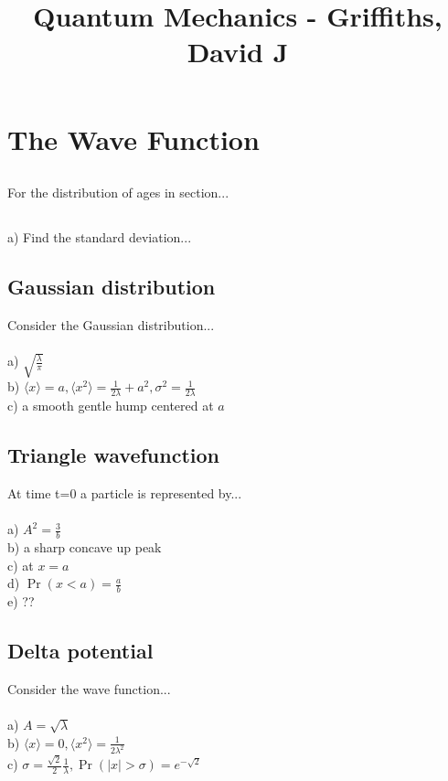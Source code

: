 \documentclass{article}
\title{Quantum Mechanics - Griffiths, David J}
\date{}
\newcommand{\<}{\langle}
\renewcommand{\>}{\rangle}
\begin{document}
\maketitle

\section{The Wave Function}

\subsection{}
For the distribution of ages in section...
\subsection{}
a) Find the standard deviation...
\subsection{Gaussian distribution}
Consider the Gaussian distribution...
\\ \\
a) $\sqrt{\frac{\lambda}{\pi}}$ \\
b) $\<x\> = a, \<x^2\> = \frac{1}{2\lambda} + a^2, \sigma^2 = \frac{1}{2\lambda}$ \\
c) a smooth gentle hump centered at $a$
\subsection{Triangle wavefunction}
At time t=0 a particle is represented by...
\\ \\
a) $A^2 = \frac{3}{b}$ \\
b) a sharp concave up peak \\
c) at $x=a$ \\
d) $\Pr(x < a) = \frac{a}{b}$ \\
e) ??
\subsection{Delta potential}
Consider the wave function...
\\ \\
a) $A = \sqrt{\lambda}$ \\
b) $\<x\> = 0, \<x^2\> = \frac{1}{2\lambda^2}$ \\
c) $\sigma = \frac{\sqrt 2}{2} \frac{1}{\lambda}, \Pr(|x| > \sigma) = e^{-\sqrt{2}}$
\subsection{}
\end{document}

